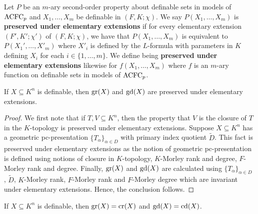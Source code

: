 \noindent Let $P$ be an $m$-ary second-order property about definable sets in models of $\mathrm{ACFC}_p$ and $X_1, \ldots, X_m$ be definable in $(F, K;\chi)$.  We say $P(X_1, \ldots, X_m)$ is {\bf preserved under elementary extensions} if for every elementary extension $(F', K';\chi')$ of $(F, K;\chi)$, we have that $P(X_1, \ldots, X_m)$ is equivalent to $P(X_1', \ldots, X'_m)$ where $X'_i$ is defined by the $L$-formula with parameters in $K$ defining $X_i$ for each $i \in \{1, \ldots, m\}$. We define being {\bf preserved under elementary extensions} likewise for $f(X_1, \ldots, X_m)$ where $f$ is an $m$-ary function on definable sets in models of $\mathrm{ACFC}_p$. 

\begin{lem} \label{Preservative}
If $X\subseteq K^n$ is definable, then $ \mathrm{gr}(X)$ and $\mathrm{gd}(X)$ are preserved under elementary extensions.
\end{lem}

\begin{proof}
We first note that if $T, V \subseteq K^n$, then the property that $V$ is the closure of $T$ in the $K$-topology is preserved under elementary extensions. Suppose $X \subseteq K^n$ has a geometric pc-presentation $\{T_\alpha \}_{\alpha \in D}$ with primary index quotient $\widetilde{D}$. This fact is preserved under elementary extensions as the notion of geometric pc-presentation is defined using notions of closure in $K$-topology, $K$-Morley rank and degree, $F$-Morley rank and degree. Finally, $\mathrm{gr}(X)$ and $\mathrm{gd}(X)$ are calculated using $\{T_\alpha \}_{\alpha \in D}$, $\widetilde{D}$, $K$-Morley rank, $F$-Morley rank and $F$-Morley degree which are invariant under elementary extensions. Hence, the conclusion follows.
\end{proof}


\begin{lem}
If $X \subseteq K^n$ is definable,
then $\mathrm{gr}(X) = \mathrm{cr}(X)$ and $\mathrm{gd}(X)=\mathrm{cd}(X)$. 
\end{lem}

